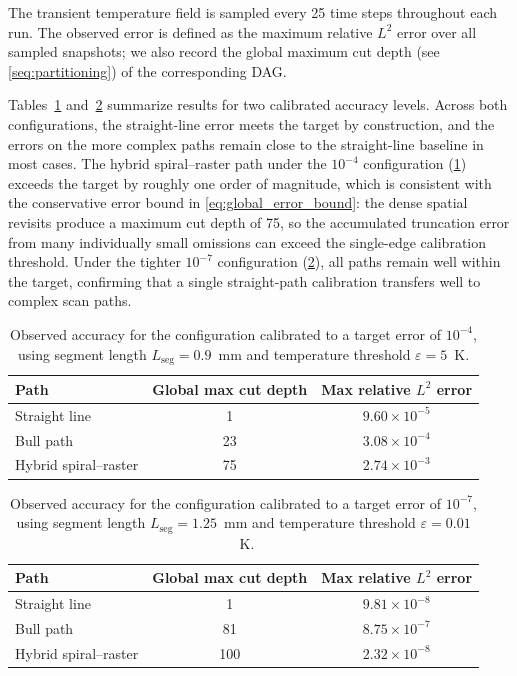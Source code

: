\documentclass[conference]{IEEEtran}
\begin{document}
The transient temperature field is sampled every 25 time steps throughout
each run. The observed error is defined as the maximum relative $L^2$ error
over all sampled snapshots; we also record the global maximum cut depth
(see \cref{seq:partitioning}) of the corresponding DAG.

Tables~\ref{tab:acc_1e4} and~\ref{tab:acc_1e7} summarize results for two
calibrated accuracy levels. Across both configurations, the straight-line
error meets the target by construction, and the errors on the more complex
paths remain close to the straight-line baseline in most cases.
The hybrid spiral--raster path under the $10^{-4}$ configuration
(\cref{tab:acc_1e4}) exceeds the target by roughly one order of magnitude,
which is consistent with the conservative error bound in
\cref{eq:global_error_bound}: the dense spatial revisits produce a maximum
cut depth of 75, so the accumulated truncation error from many individually
small omissions can exceed the single-edge calibration threshold.
Under the tighter $10^{-7}$ configuration (\cref{tab:acc_1e7}), all paths
remain well within the target, confirming that a single straight-path calibration transfers well to complex scan paths.

\begin{table}[h]
\centering
\caption{Observed accuracy for the configuration calibrated to a target
error of $10^{-4}$, using segment length $L_{\mathrm{seg}}=0.9$~mm and temperature
threshold $\varepsilon=5$~K.}
\label{tab:acc_1e4}
\begin{tabular}{lcc}
\hline
Path & Global max cut depth & Max relative $L^2$ error \\
\hline
Straight line        & 1  & $9.60\times10^{-5}$ \\
Bull path            & 23 & $3.08\times10^{-4}$ \\
Hybrid spiral--raster & 75 & $2.74\times10^{-3}$ \\
\hline
\end{tabular}
\end{table}

\begin{table}[h]
\centering
\caption{Observed accuracy for the configuration calibrated to a target
error of $10^{-7}$, using segment length $L_{\mathrm{seg}}=1.25$~mm and temperature
threshold $\varepsilon=0.01$~K.}
\label{tab:acc_1e7}
\begin{tabular}{lcc}
\hline
Path & Global max cut depth & Max relative $L^2$ error \\
\hline
Straight line        & 1   & $9.81\times10^{-8}$ \\
Bull path            & 81  & $8.75\times10^{-7}$ \\
Hybrid spiral--raster & 100 & $2.32\times10^{-8}$ \\
\hline
\end{tabular}
\end{table}
\end{document}
